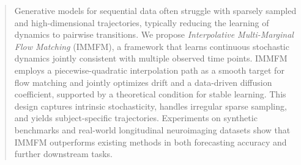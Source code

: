 \documentclass[twoside]{article}
\begin{document}
%

%





\begin{abstract}
Generative models for sequential data often struggle with sparsely sampled and high-dimensional trajectories, typically reducing the learning of dynamics to pairwise transitions. We propose \textit{Interpolative Multi-Marginal Flow Matching} (IMMFM), a framework that learns continuous stochastic dynamics jointly consistent with multiple observed time points. IMMFM employs a piecewise-quadratic interpolation path as a smooth target for flow matching and jointly optimizes drift and a data-driven diffusion coefficient, supported by a theoretical condition for stable learning. This design captures intrinsic stochasticity, handles irregular sparse sampling, and yields subject-specific trajectories. Experiments on synthetic benchmarks and real-world longitudinal neuroimaging datasets show that IMMFM outperforms existing methods in both forecasting accuracy and further downstream tasks.
\end{abstract}
\end{document}
